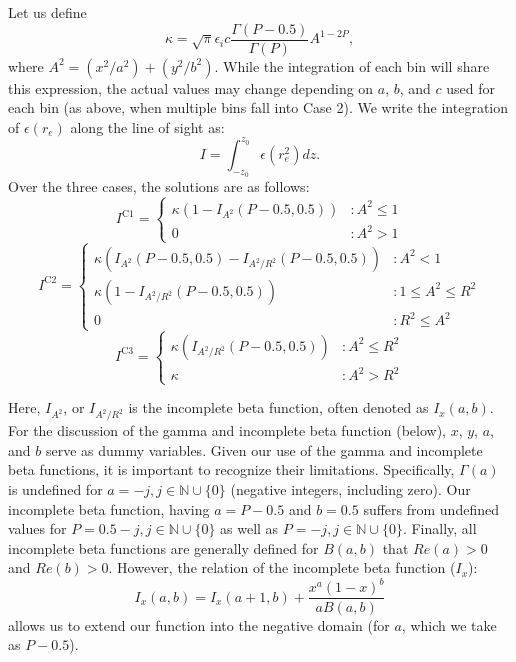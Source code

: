 \documentclass[twocolumn,traditabstract]{aa}
\begin{document}
Let us define
\begin{equation}
  \kappa = \sqrt{\pi}\epsilon_i c \frac{\Gamma(P-0.5)}{\Gamma(P)}A^{1-2P},
\end{equation}
where $A^2 = (x^2 / a^2) + (y^2 / b^2)$.
While the integration of each bin will share this expression, the actual values may change depending on $a$, $b$, and $c$ used for
each bin (as above, when multiple bins fall into Case 2). We write the  integration of $\epsilon(r_e)$ along the line of sight as:
\begin{equation}
  I = \int_{-z_0}^{z_0} \epsilon(r_e^2) dz.
  \label{eqn:los_int_setup}
\end{equation}
Over the three cases, the solutions are as follows:
\begin{equation}
  I^{\text{C1}} = \left\{
  \begin{array}{lr}
    \kappa (1-I_{A^2}(P-0.5,0.5)) &: A^2 \leq 1 \\
    0 &: A^2 > 1
  \end{array}
  \right.
  \label{eqn:case1_int}
\end{equation}
\begin{equation}
  I^{\text{C2}} = \left\{
  \begin{array}{lr}
    \kappa (I_{A^2}(P-0.5,0.5)-I_{A^2/R^2}(P-0.5,0.5)) &: A^2 < 1 \\
    \kappa (1-I_{A^2/R^2}(P-0.5,0.5)) &: 1 \leq A^2 \leq R^2 \\
    0 &: R^2 \leq A^2
  \end{array}
  \right.
\end{equation}
\begin{equation}
  I^{\text{C3}} = \left\{
  \begin{array}{lr}
    \kappa (I_{A^2/R^2}(P-0.5,0.5)) &: A^2 \leq R^2 \\
    \kappa &: A^2 > R^2
  \end{array}
  \right.
\end{equation}

Here, $I_{A^2}$, or $I_{A^2/R^2}$ is the incomplete beta function, often denoted as $I_x(a,b)$. For the discussion of
the gamma and incomplete beta function (below), $x$, $y$, $a$, and $b$ serve as dummy variables. Given our use of
the gamma and incomplete beta functions, it is important to recognize their limitations.
Specifically, $\Gamma(a)$ is undefined for $a = -j, j \in \mathbb{N} \cup \{0\}$ (negative integers, including
zero). Our incomplete beta function, having $a = P -0.5$ and $b = 0.5$ suffers from undefined values
for $P = 0.5-j, j \in \mathbb{N} \cup \{0\}$ as well as $P = -j, j \in \mathbb{N} \cup \{0\}$. Finally, all incomplete
beta functions are generally defined for $B(a,b)$ that $Re(a) > 0$ and $Re(b) > 0$. However, the relation of the
incomplete beta function ($I_x$):
\begin{equation}
  I_x(a,b) = I_x(a+1,b) + \frac{x^a (1-x)^b}{a B(a,b)}
  \label{eqn:recibeta}
\end{equation}
allows us to extend our function into the negative domain (for $a$, which we take as $P-0.5$). 
\end{document}
